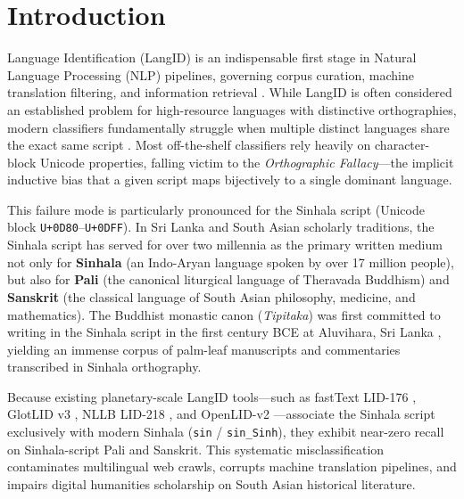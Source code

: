 \documentclass[11pt]{article}
\begin{document}
\section{Introduction}
Language Identification (LangID) is an indispensable first stage in Natural Language Processing (NLP) pipelines, governing corpus curation, machine translation filtering, and information retrieval \cite{jauhiainen2019automatic,lui2012langid,joulin2017bag,kargaran2023glotlid}. While LangID is often considered an established problem for high-resource languages with distinctive orthographies, modern classifiers fundamentally struggle when multiple distinct languages share the exact same script \cite{caswell2020language,dunn2023commonlid,burchell2023openlid}. Most off-the-shelf classifiers rely heavily on character-block Unicode properties, falling victim to the \textit{Orthographic Fallacy}—the implicit inductive bias that a given script maps bijectively to a single dominant language.

This failure mode is particularly pronounced for the Sinhala script (Unicode block \texttt{U+0D80}--\texttt{U+0DFF}). In Sri Lanka and South Asian scholarly traditions, the Sinhala script has served for over two millennia as the primary written medium not only for \textbf{Sinhala} (an Indo-Aryan language spoken by over 17 million people), but also for \textbf{Pali} (the canonical liturgical language of Theravada Buddhism) and \textbf{Sanskrit} (the classical language of South Asian philosophy, medicine, and mathematics). The Buddhist monastic canon (\textit{Tipitaka}) was first committed to writing in the Sinhala script in the first century BCE at Aluvihara, Sri Lanka \cite{norman1983pali}, yielding an immense corpus of palm-leaf manuscripts and commentaries transcribed in Sinhala orthography.

Because existing planetary-scale LangID tools—such as fastText LID-176 \cite{joulin2017bag}, GlotLID v3 \cite{kargaran2023glotlid}, NLLB LID-218 \cite{nllb2022}, and OpenLID-v2 \cite{burchell2023openlid}—associate the Sinhala script exclusively with modern Sinhala (\texttt{sin} / \texttt{sin\_Sinh}), they exhibit near-zero recall on Sinhala-script Pali and Sanskrit. This systematic misclassification contaminates multilingual web crawls, corrupts machine translation pipelines, and impairs digital humanities scholarship on South Asian historical literature.
\end{document}
